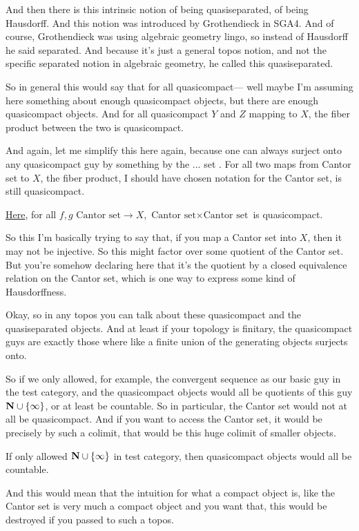And then there is this intrinsic notion of being quasiseparated, of being Hausdorff. And this notion was introduced by Grothendieck in SGA4. And of course, Grothendieck was using algebraic geometry lingo, so instead of Hausdorff he said separated. And because it's just a general topos notion, and not the specific separated notion in algebraic geometry, he called this quasiseparated.

So in general this would say that for all quasicompact--- well maybe I'm assuming here something about enough quasicompact objects, but there are enough quasicompact objects. And for all quasicompact $Y$ and $Z$ mapping to $X$, the fiber product between the two is quasicompact.

And again, let me simplify this here again, because one can always surject onto any quasicompact guy by something by the ... set . For all two maps from Cantor set to $X$, the fiber product, I should have chosen notation for the Cantor set, is still quasicompact.

\underline{Here}, for all $f, g$ $\text{Cantor set} \to X$, $\text{Cantor set} \times \text{Cantor set}$ is quasicompact.

So this I'm basically trying to say that, if you map a Cantor set into $X$, then it may not be injective. So this might factor over some quotient of the Cantor set. But you're somehow declaring here that it's the quotient by a closed equivalence relation on the Cantor set, which is one way to express some kind of Hausdorffness.

Okay, so in any topos you can talk about these quasicompact and the quasiseparated objects. And at least if your topology is finitary, the quasicompact guys are exactly those where like a finite union of the generating objects surjects onto.

So if we only allowed, for example, the convergent sequence as our basic guy in the test category, and the quasicompact objects would all be quotients of this guy $\mathbf N \cup \{\infty\}$, or at least be countable. 
So in particular, the Cantor set would not at all be quasicompact. And if you want to access the Cantor set, it would be precisely by such a colimit, that would be this huge colimit of smaller objects.

If only allowed $\mathbf N \cup \{\infty\}$ in test category, then quasicompact objects would all be countable.

And this would mean that the intuition for what a compact object is, like the Cantor set is very much a compact object and you want that, this would be destroyed if you passed to such a topos.

